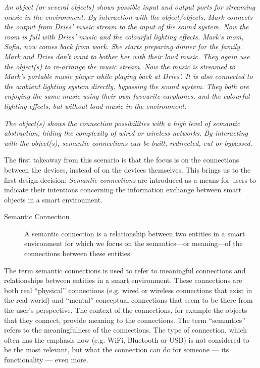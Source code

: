 \emph{An object (or several objects) shows possible input and output ports for streaming music in the environment. By interaction with the object/objects, Mark connects the output from Dries' music stream to the input of the sound system. Now the room is full with Dries' music and the colourful lighting effects. Mark's mom, Sofia, now comes back from work. She starts preparing dinner for the family. Mark and Dries don't want to bother her with their loud music. They again use the object(s) to re-arrange the music stream. Now the music is streamed to Mark's portable music player while playing back at Dries'. It is also connected to the ambient lighting system directly, bypassing the sound system. They both are enjoying the same music using their own favourite earphones, and the colourful lighting effects, but without loud music in the environment.}

\emph{The object(s) shows the connection possibilities with a high level of semantic abstraction, hiding the complexity of wired or wireless networks. By interacting with the object(s), semantic connections can be built, redirected, cut or bypassed.}

The first takeaway from this scenario is that the focus is on the connections between the devices, instead of on the devices themselves. This brings us to the first design decision: \emph{Semantic connections} are introduced as a means for users to indicate their intentions concerning the information exchange between smart objects in a smart environment. 


\begin{description}
	\item [Semantic Connection] A semantic connection is a relationship between two entities in a smart environment for which we focus on the semantics---or meaning---of the connections between these entities. 
\end{description}

The term semantic connections is used to refer to meaningful connections and relationships between entities in a smart environment. These connections are both real ``physical'' connections (e.g. wired or wireless connections that exist in the real world) and ``mental'' conceptual connections that seem to be there from the user's perspective. The context of the connections, for example the objects that they connect, provide meaning to the connections. The term ``semantics'' refers to the meaningfulness of the connections. The type of connection, which often has the emphasis now (e.g. WiFi, Bluetooth or USB) is not considered to be the most relevant, but what the connection can do for someone --- its functionality --- even more.


